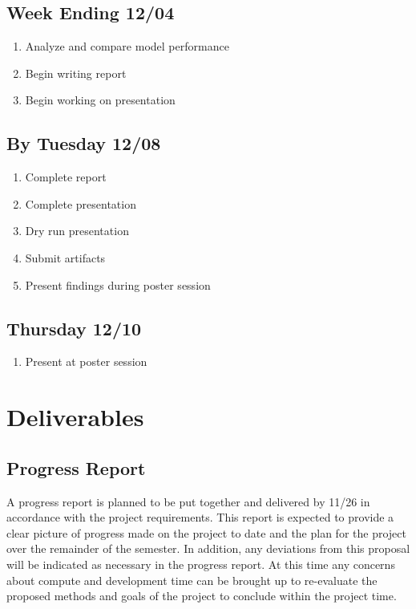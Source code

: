 \documentclass[conference]{IEEEtran}
\begin{document}
\subsection{Week Ending 12/04}
\begin{enumerate}
    \item Analyze and compare model performance
    \item Begin writing report
    \item Begin working on presentation
\end{enumerate}

\subsection{By Tuesday 12/08}
\begin{enumerate}
    \item Complete report
    \item Complete presentation
    \item Dry run presentation
    \item Submit artifacts
    \item Present findings during poster session
\end{enumerate}

\subsection{Thursday 12/10}
\begin{enumerate}
    \item Present at poster session
\end{enumerate}

\section{Deliverables}

\subsection{Progress Report}
A progress report is planned to be put together and delivered by 11/26 in accordance with the project requirements.
This report is expected to provide a clear picture of progress made on the project to date and the plan for the project over the remainder of the semester.
In addition, any deviations from this proposal will be indicated as necessary in the progress report. At this time any concerns about compute and development time can be brought up to re-evaluate the proposed methods and goals of the project to conclude within the project time.
\end{document}
